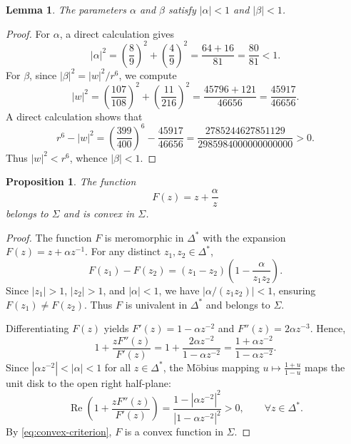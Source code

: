 \documentclass[11pt,reqno]{amsart}
\newtheorem{lemma}[theorem]{Lemma}
\newtheorem{proposition}[theorem]{Proposition}
\theoremstyle{definition}
\renewcommand{\Re}{\operatorname{Re}}
\begin{document}
\begin{lemma}\label{lem:modulus}
The parameters $\alpha$ and $\beta$ satisfy $|\alpha| < 1$ and $|\beta| < 1$.
\end{lemma}
\begin{proof}
For $\alpha$, a direct calculation gives
\begin{equation}
|\alpha|^2 = \left(\frac{8}{9}\right)^2 + \left(\frac{4}{9}\right)^2 = \frac{64+16}{81} = \frac{80}{81} < 1.
\end{equation}
For $\beta$, since $|\beta|^2 = |w|^2 / r^6$, we compute
\begin{equation}
|w|^2 = \left(\frac{107}{108}\right)^2 + \left(\frac{11}{216}\right)^2 = \frac{45796 + 121}{46656} = \frac{45917}{46656}.
\end{equation}
A direct calculation shows that
\begin{equation}
r^6 - |w|^2 = \left(\frac{399}{400}\right)^6 - \frac{45917}{46656} = \frac{2785244627851129}{2985984000000000000} > 0.
\end{equation}
Thus $|w|^2 < r^6$, whence $|\beta| < 1$.
\end{proof}

\begin{proposition}\label{prop:F}
The function
\begin{equation}\label{eq:def-F}
F(z) = z + \frac{\alpha}{z}
\end{equation}
belongs to $\Sigma$ and is convex in $\Sigma$.
\end{proposition}
\begin{proof}
The function $F$ is meromorphic in $\Delta^*$ with the expansion $F(z) = z + \alpha z^{-1}$. For any distinct $z_1, z_2 \in \Delta^*$,
\begin{equation}
F(z_1) - F(z_2) = (z_1 - z_2)\left(1 - \frac{\alpha}{z_1 z_2}\right).
\end{equation}
Since $|z_1| > 1$, $|z_2| > 1$, and $|\alpha| < 1$, we have $|\alpha / (z_1 z_2)| < 1$, ensuring $F(z_1) \neq F(z_2)$. Thus $F$ is univalent in $\Delta^*$ and belongs to $\Sigma$.

Differentiating $F(z)$ yields $F'(z) = 1 - \alpha z^{-2}$ and $F''(z) = 2\alpha z^{-3}$. Hence,
\begin{equation}
1 + \frac{z F''(z)}{F'(z)} = 1 + \frac{2\alpha z^{-2}}{1 - \alpha z^{-2}} = \frac{1 + \alpha z^{-2}}{1 - \alpha z^{-2}}.
\end{equation}
Since $|\alpha z^{-2}| < |\alpha| < 1$ for all $z \in \Delta^*$, the Möbius mapping $u \mapsto \frac{1+u}{1-u}$ maps the unit disk to the open right half-plane:
\begin{equation}
\Re\left(1 + \frac{z F''(z)}{F'(z)}\right) = \frac{1 - |\alpha z^{-2}|^2}{|1 - \alpha z^{-2}|^2} > 0, \qquad \forall z \in \Delta^*.
\end{equation}
By \eqref{eq:convex-criterion}, $F$ is a convex function in $\Sigma$.
\end{proof}
\end{document}
